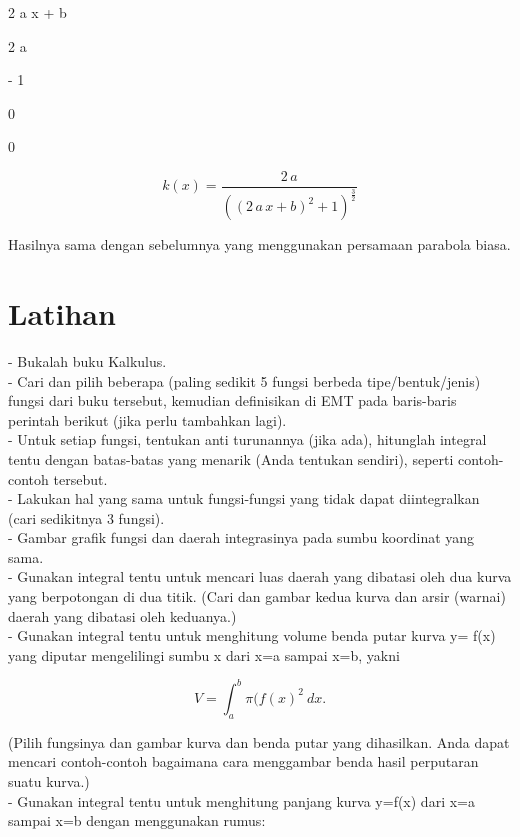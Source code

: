 \documentclass{article}
\newenvironment{eulernotebook}{\par}{\par}
\newcommand{\eulerheading}[1]{\section{#1}}
\newenvironment{eulercomment}{\par\medskip}{\par\medskip}
\newenvironment{eulerformula}{}{}
\begin{document}
\begin{eulernotebook}
\begin{eulercomment}
\begin{eulercomment}
\begin{eulercomment}
\begin{eulercomment}
\begin{euleroutput}
                                2 a x + b
  
  
                                   2 a
  
  
                                   - 1
  
  
                                    0
  
  
                                    0
  
\end{euleroutput}
\begin{eulerformula}
\[
k\left(x\right)=\frac{2\,a}{\left(\left(2\,a\,x+b\right)^2+1\right)  ^{\frac{3}{2}}}
\]
\end{eulerformula}
\begin{eulercomment}
Hasilnya sama dengan sebelumnya yang menggunakan persamaan parabola biasa.
\end{eulercomment}
\eulerheading{Latihan}
\begin{eulercomment}
- Bukalah buku Kalkulus.\\
- Cari dan pilih beberapa (paling sedikit 5 fungsi berbeda tipe/bentuk/jenis) fungsi dari buku tersebut, kemudian definisikan di
EMT pada baris-baris perintah berikut (jika perlu tambahkan lagi).\\
- Untuk setiap fungsi, tentukan anti turunannya (jika ada), hitunglah integral tentu dengan batas-batas yang menarik (Anda
tentukan sendiri), seperti contoh-contoh tersebut.\\
- Lakukan hal yang sama untuk fungsi-fungsi yang tidak dapat diintegralkan (cari sedikitnya 3 fungsi).\\
- Gambar grafik fungsi dan daerah integrasinya pada sumbu koordinat yang sama.\\
- Gunakan integral tentu untuk mencari luas daerah yang dibatasi oleh dua kurva yang berpotongan di dua titik. (Cari dan gambar
kedua kurva dan arsir (warnai) daerah yang dibatasi oleh keduanya.)\\
- Gunakan integral tentu untuk menghitung volume benda putar kurva y= f(x) yang diputar mengelilingi sumbu x dari x=a sampai x=b,
yakni

\end{eulercomment}
\begin{eulerformula}
\[
V = \int_a^b \pi (f(x)^2\ dx.
\]
\end{eulerformula}
\begin{eulercomment}
(Pilih fungsinya dan gambar kurva dan benda putar yang dihasilkan. Anda dapat mencari contoh-contoh bagaimana cara menggambar
benda hasil perputaran suatu kurva.)\\
- Gunakan integral tentu untuk menghitung panjang kurva y=f(x) dari x=a sampai x=b dengan menggunakan rumus:


\end{eulercomment}
\end{eulercomment}
\end{eulercomment}
\end{eulercomment}
\end{eulercomment}
\end{eulernotebook}
\end{document}
